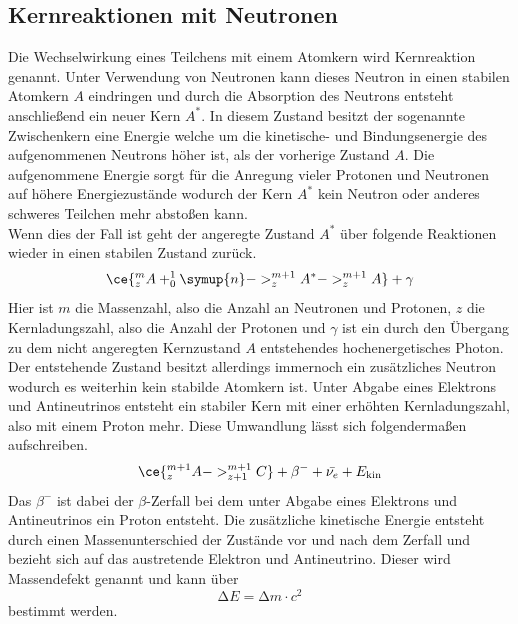 \subsection{Kernreaktionen mit Neutronen}
Die Wechselwirkung eines Teilchens mit einem Atomkern wird Kernreaktion genannt. 
Unter Verwendung von Neutronen kann dieses Neutron in einen stabilen Atomkern $A$ eindringen und durch die Absorption des Neutrons
entsteht anschließend ein neuer Kern $A^{*}$. In diesem Zustand besitzt der sogenannte Zwischenkern eine Energie welche um die kinetische- und Bindungsenergie
des aufgenommenen Neutrons höher ist, als der vorherige Zustand $A$. Die aufgenommene Energie sorgt für die Anregung vieler Protonen und Neutronen auf höhere Energiezustände
wodurch der Kern $A^{*}$ kein Neutron oder anderes schweres Teilchen mehr abstoßen kann. 
\\
Wenn dies der Fall ist geht der angeregte Zustand $A^{*}$ über folgende Reaktionen wieder in einen stabilen Zustand zurück.
\begin{equation}
    \ce{^{m}_{z}A + ^{1}_{0}\symup{n} -> ^{m+1}_{z}A^{*} -> ^{m+1}_{z}A} + \gamma
\end{equation}
Hier ist $m$ die Massenzahl, also die Anzahl an Neutronen und Protonen, $z$ die Kernladungszahl, also die Anzahl der Protonen und $\gamma$ ist ein durch den Übergang zu dem nicht angeregten Kernzustand $A$
entstehendes hochenergetisches Photon.
\\
Der entstehende Zustand besitzt allerdings immernoch ein zusätzliches Neutron wodurch es weiterhin kein stabilde Atomkern ist. Unter Abgabe eines Elektrons und Antineutrinos entsteht ein stabiler Kern
mit einer erhöhten Kernladungszahl, also mit einem Proton mehr. Diese Umwandlung lässt sich folgendermaßen aufschreiben.
\begin{equation}
\label{eqn:zerfalleinfach}
\ce{^{m+1}_{z}A -> ^{m+1}_{z+1}C} +\beta^{-} + \bar{\nu_{e}} + E_{\text{kin}}
\end{equation}
Das ${\beta}^{-}$ ist dabei der $\beta$-Zerfall bei dem unter Abgabe eines Elektrons und Antineutrinos ein Proton entsteht.
Die zusätzliche kinetische Energie entsteht durch einen Massenunterschied der Zustände vor und nach dem Zerfall und bezieht sich auf das austretende Elektron und Antineutrino. Dieser wird
Massendefekt genannt und kann über 
\begin{equation}
\label{eqn:einsteineq}
\increment E = \increment m \cdot c^2
\end{equation}
bestimmt werden. 
\\
